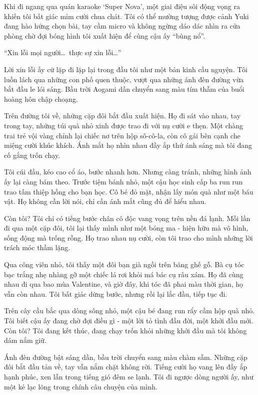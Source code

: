 \documentclass[../main.tex]{subfiles}
\begin{document}
Khi đi ngang qua quán karaoke `Super Nova', một giai điệu sôi động vọng ra khiến tôi bất giác mỉm cười chua chát. Tôi có thể mường tượng được cảnh Yuki đang hào hứng chọn bài, tay cầm micro và không ngừng dáo dác nhìn ra cửa phòng chờ đợi bóng hình tôi xuất hiện để cùng cậu ấy ``bùng nổ''.

``Xin lỗi mọi người\dots\ thực sự xin lỗi\dots''

Lời xin lỗi ấy cứ lặp đi lặp lại trong đầu tôi như một bản kinh cầu nguyện. Tôi luồn lách qua những con phố quen thuộc, vượt qua những ánh đèn đường vừa bắt đầu le lói sáng. Bầu trời Aogami dần chuyển sang màu tím thẫm của buổi hoàng hôn chập choạng.

Trên đường tôi về, những cặp đôi bắt đầu xuất hiện. Họ đi sát vào nhau, tay trong tay, những túi quà nhỏ xinh được trao đi với nụ cười e thẹn. Một chàng trai trẻ vội vàng chỉnh lại chiếc nơ trên hộp sô-cô-la, còn cô gái bên cạnh che miệng cười khúc khích. Ánh mắt họ nhìn nhau đầy ắp thứ ánh sáng mà tôi đang cố gắng trốn chạy.

Tôi cúi đầu, kéo cao cổ áo, bước nhanh hơn. Nhưng càng tránh, những hình ảnh ấy lại càng bám theo. Trước tiệm bánh nhỏ, một cậu học sinh cấp ba run run trao tấm thiệp hồng cho bạn học. Cô bé đỏ mặt, nhận lấy món quà như một báu vật. Họ không cần lời nói, chỉ cần ánh mắt cũng đủ để hiểu nhau.

Còn tôi? Tôi chỉ có tiếng bước chân cô độc vang vọng trên nền đá lạnh. Mỗi lần đi qua một cặp đôi, tôi lại thấy mình như một bóng ma - hiện hữu mà vô hình, sống động mà trống rỗng. Họ trao nhau nụ cười, còn tôi trao cho mình những lời trách móc thầm lặng.

Qua công viên nhỏ, tôi thấy một đôi bạn già ngồi trên băng ghế gỗ. Bà cụ tóc bạc trắng nhẹ nhàng gỡ một chiếc lá rơi khỏi má bác cụ râu xám. Họ đã cùng nhau đi qua bao mùa Valentine, và giờ đây, khi tóc đã phai màu thời gian, họ vẫn còn nhau. Tôi bất giác dừng bước, nhưng rồi lại lắc đầu, tiếp tục đi.

Trên cây cầu bắc qua dòng sông nhỏ, một cậu bé đang run rẩy cầm hộp quà nhỏ. Tôi biết cậu ấy đang chờ đợi điều gì - một lời tỏ tình đầu đời, một khởi đầu mới. Còn tôi? Tôi đang kết thúc, đang chạy trốn khỏi những khởi đầu mà tôi không dám nắm giữ.

Ánh đèn đường bật sáng dần, bầu trời chuyển sang màu chàm sẫm. Những cặp đôi bắt đầu tản về, tay vẫn nắm chặt không rời. Tiếng cười họ vang lên đầy ắp hạnh phúc, xen lẫn trong tiếng gió đêm se lạnh. Tôi đi ngược dòng người ấy, như một kẻ lạc lõng trong chính câu chuyện của mình.
\end{document}
